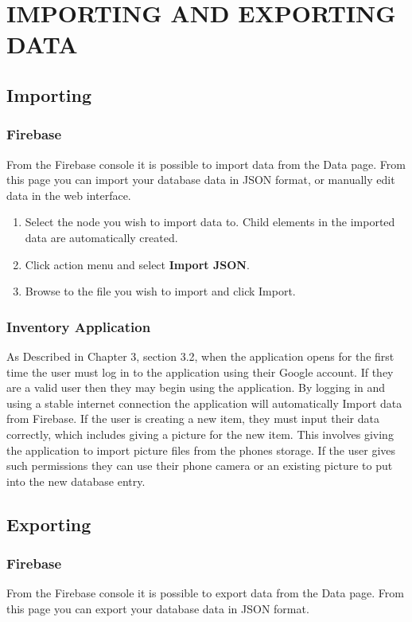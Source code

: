 \chapter{IMPORTING AND EXPORTING DATA}

\section{Importing}

\subsection{Firebase}
 From the Firebase console it is possible to import data from the Data page. From this page you can import your database data in JSON format, or manually edit data in the web interface.

\begin{enumerate}
	\item Select the node you wish to import data to. Child elements in the imported data are automatically created.
	\item Click action menu and select \textbf{Import JSON}.
	\item Browse to the file you wish to import and click Import.
\end{enumerate}

\subsection{Inventory Application}
 As Described in Chapter 3, section 3.2, when the application opens for the first time the user must log in to the application using their Google account. If they are a valid user then they may begin using the application. By logging in and using a stable internet connection the application will automatically Import data from Firebase. If the user is creating a new item, they must input their data correctly, which includes giving a picture for the new item. This involves giving the application to import picture files from the phones storage. If the user gives such permissions they can use their phone camera or an existing picture to put into the new database entry.     

\section{Exporting}

\subsection{Firebase}
 From the Firebase console it is possible to export data from the Data page. From this page you can export your database data in JSON format.

